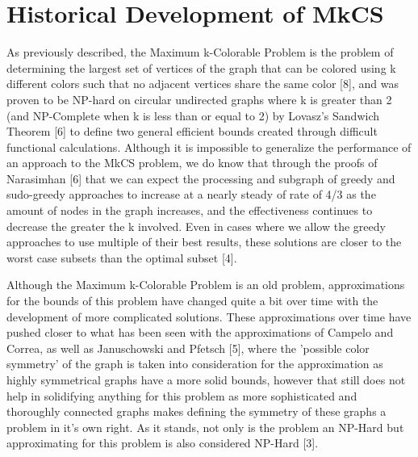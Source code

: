 \documentclass{article}
\begin{document}
 \section{Historical Development of MkCS}
 \hspace{\parindent} As previously described, the Maximum k-Colorable Problem is the problem of determining the largest set of vertices of the graph that can be colored using k different colors such that no adjacent vertices share the same color [8], and was proven to be NP-hard on circular undirected graphs where k is greater than 2 (and NP-Complete when k is less than or equal to 2) by Lovasz's Sandwich Theorem [6] to define two general efficient bounds created through difficult functional calculations. Although it is impossible to generalize the performance of an approach to the MkCS problem, we do know that through the proofs of Narasimhan [6] that we can expect the processing and subgraph of greedy and sudo-greedy approaches to increase at a nearly steady of rate of 4/3 as the amount of nodes in the graph increases, and the effectiveness continues to decrease the greater the k involved. Even in cases where we allow the greedy approaches to use multiple of their best results, these solutions are closer to the worst case subsets than the optimal subset [4]. 
 \par Although the Maximum k-Colorable Problem is an old problem, approximations for the bounds of this problem have changed quite a bit over time with the development of more complicated solutions. These approximations over time have pushed closer to what has been seen with the approximations of Campelo and Correa, as well as Januschowski and Pfetsch [5], where the 'possible color symmetry' of the graph is taken into consideration for the approximation as highly symmetrical graphs have a more solid bounds, however that still does not help in solidifying anything for this problem as more sophisticated and thoroughly connected graphs makes defining the symmetry of these graphs a problem in it's own right. As it stands, not only is the problem an NP-Hard but approximating for this problem is also considered NP-Hard [3].
 
\end{document}
